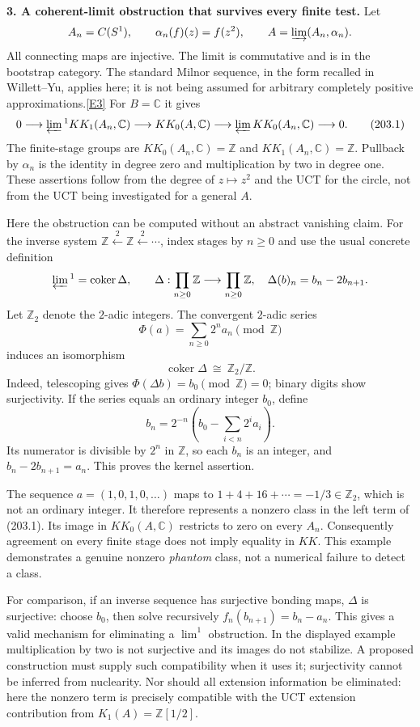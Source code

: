 \documentclass[11pt,a4paper]{article}
\newcommand{\Z}{\mathbb{Z}}
\newcommand{\C}{\mathbb{C}}
\newcommand{\eref}[2]{\hyperlink{extra:#1:#2}{[E#2]}}
\begin{document}
\textbf{3. A coherent-limit obstruction that survives every finite test.}
Let
\[
 A_n=C(S^1),\qquad \alpha_n(f)(z)=f(z^2),\qquad
 A=\varinjlim(A_n,\alpha_n).
\]
All connecting maps are injective. The limit is commutative and is in the
bootstrap category. The standard Milnor sequence, in the form recalled
in Willett--Yu, applies here; it is not being assumed for arbitrary
completely positive approximations.\eref{statement}{3}
For $B=\C$ it gives
\[
 0\longrightarrow\varprojlim{}^{1} KK_1(A_n,\C)
 \longrightarrow KK_0(A,\C)
 \longrightarrow\varprojlim KK_0(A_n,\C)\longrightarrow0.
 \tag{203.1}
\]
The finite-stage groups are $KK_0(A_n,\C)=\Z$ and
$KK_1(A_n,\C)=\Z$. Pullback by $\alpha_n$ is the identity in degree zero
and multiplication by two in degree one. These assertions follow from
the degree of $z\mapsto z^2$ and the UCT for the circle, not from the UCT
being investigated for a general $A$.

Here the obstruction can be computed without an abstract vanishing
claim. For the inverse system $\Z\xleftarrow{2}\Z\xleftarrow{2}\cdots$,
index stages by $n\ge0$ and use the usual concrete definition
\[
 \varprojlim{}^{1}=\operatorname{coker}\Delta,\qquad
 \Delta:\prod_{n\ge0}\Z\longrightarrow\prod_{n\ge0}\Z,
 \quad\Delta(b)_n=b_n-2b_{n+1}.
\]
Let $\Z_2$ denote the $2$-adic integers. The convergent $2$-adic series
\[
 \Phi(a)=\sum_{n\ge0}2^n a_n\pmod{\Z}
\]
induces an isomorphism
\[
 \operatorname{coker}\Delta\ \cong\ \Z_2/\Z. \tag{203.2}
\]
Indeed, telescoping gives $\Phi(\Delta b)=b_0\pmod\Z=0$; binary digits
show surjectivity. If the series equals an ordinary integer $b_0$, define
\[
 b_n=2^{-n}\left(b_0-\sum_{i<n}2^ia_i\right).
\]
Its numerator is divisible by $2^n$ in $\Z$, so each $b_n$ is an integer,
and $b_n-2b_{n+1}=a_n$. This proves the kernel assertion.

The sequence $a=(1,0,1,0,\ldots)$ maps to
$1+4+16+\cdots=-1/3\in\Z_2$, which is not an ordinary integer. It
therefore represents a nonzero class in the left term of (203.1).
Its image in $KK_0(A,\C)$ restricts to zero on every $A_n$.
Consequently agreement on every finite stage does not imply equality in
$KK$. This example demonstrates a genuine nonzero \emph{phantom} class,
not a numerical failure to detect a class.

For comparison, if an inverse sequence has surjective bonding maps,
$\Delta$ is surjective: choose $b_0$, then solve recursively
$f_n(b_{n+1})=b_n-a_n$. This gives a valid mechanism for eliminating a
$\lim^1$ obstruction. In the displayed example multiplication by two is
not surjective and its images do not stabilize. A proposed construction
must supply such compatibility when it uses it; surjectivity cannot be
inferred from nuclearity. Nor should all extension information be
eliminated: here the nonzero term is precisely compatible with the UCT
extension contribution from $K_1(A)=\Z[1/2]$.
\end{document}
